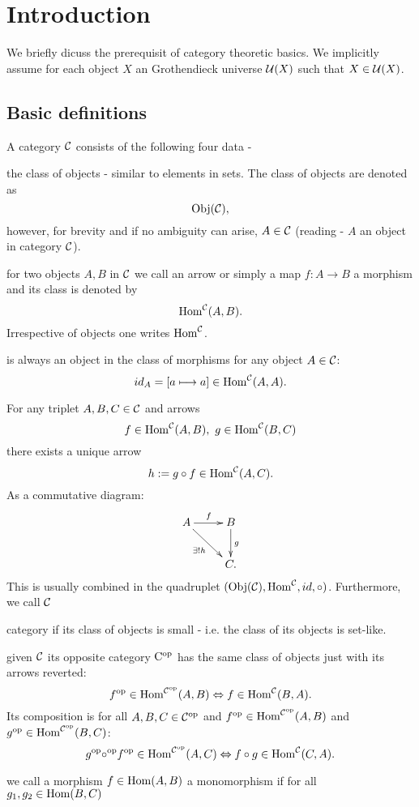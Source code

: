 \section{Introduction}

We briefly dicuss the prerequisit of category theoretic basics. We implicitly assume for each object $X$ an Grothendieck universe $\mathcal{U}(X)$ such that $X \in \mathcal{U}(X)$.
\\
\subsection{Basic definitions}

A category $\mathcal{C}$ consists of the following four data -
\bd
\item[Objects] the class of objects - similar to elements in sets. The class of objects are denoted as
$$\mathrm{Obj}(\mathcal{C}),$$
however, for brevity and if no ambiguity can arise, $A \in \mathcal{C}$ (reading - $A$ an object in category $\mathcal{C}$).
\item[Morphisms] for two objects $A, B$ in $\mathcal{C}$ we call an arrow or simply a map $f : A \longrightarrow B$ a morphism and its class is denoted by
$$\mathrm{Hom}^{\mathcal{C}}(A,B).$$
Irrespective of objects one writes $\mathrm{Hom}^{\mathcal{C}}$.
\item[Identity] is always an object in the class of morphisms for any object $A \in \mathcal{C}$:
$$id_A = [a \longmapsto a] \in \mathrm{Hom}^{\mathcal{C}}(A,A).$$
\item[Composition] For any triplet $A, B, C \in \mathcal{C}$ and arrows
$$f \in  \mrm{Hom}^{\calc}(A, B),\ g \in \mrm{Hom}^{\calc}(B, C)$$
there exists a unique arrow
$$h := g \circ f \in \mathrm{Hom}^{\mathcal{C}}(A,C).$$
As a commutative diagram:
$$\xymatrix{A \ar[r]^{f}\ar[rd]_{\exists!h}&B\ar[d]^g\\
&C.}$$
This is usually combined in the quadruplet $(\mathrm{Obj}(\mathcal{C}),\mathrm{Hom}^{\mathcal{C}},id,\circ)$.
\ed
Furthermore, we call $\mathcal{C}$
\bd
\item[small] category if its class of objects is small - i.e. the class of its objects is set-like.
\item[dual] given $\mathcal{C}$ its opposite category $\mathrm{C^{\mathrm{op}}}$ has the same class of objects just with its arrows reverted:
$${f}^{\rm{op}} \in \mathrm{Hom}^{{\mathcal{C}}^{\rm{op}}}(A,B) \Leftrightarrow f \in \mathrm{Hom}^{\mathcal{C}}(B,A).$$
Its composition is for all $A, B, C \in {\mathcal{C}}^{\rm{op}}$ and ${f}^{\rm{op}} \in \mathrm{Hom}^{{\mathcal{C}}^{\rm{op}}}(A,B)$ and ${g}^{\rm{op}} \in \mathrm{Hom}^{{\mathcal{C}}^{\rm{op}}}(B,C)$:
$${g}^{\rm{op}} {\circ}^{\rm{op}} {f}^{\rm{op}} \in \mathrm{Hom}^{{\mathcal{C}}^{\rm{op}}}(A,C) \Leftrightarrow f \circ g \in \mathrm{Hom}^{\mathcal{C}}(C,A).$$
\item[monomorphims] we call a morphism $f \in \mathrm{Hom}(A,B)$ a monomorphism if for all $g_1, g_2 \in \mathrm{Hom}(B,C)$
